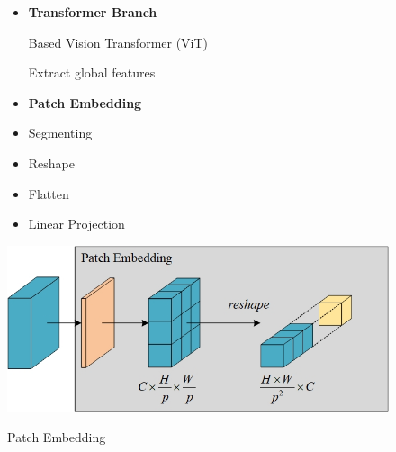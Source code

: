\documentclass[CJK,aspectratio=169]{beamer}  %
\begin{document}
	\begin{frame}
		\begin{figure}
			\centering
			\begin{minipage}{.45\textwidth}
			\begin{itemize} 
				\item \textbf{Transformer Branch}
				
				Based Vision Transformer (ViT)
				
				Extract global features
				
			\end{itemize}
			
	
			\begin{itemize} 
				\item \textbf{Patch Embedding}
				
				\item[\checkmark] Segmenting
				
				\item[\checkmark] Reshape
				
				\item[\checkmark] Flatten
				
				\item[\checkmark] Linear Projection
				
			\end{itemize}
			\end{minipage}
			\begin{minipage}{.45\textwidth}
				\includegraphics[width=0.85\linewidth]{picture/LLIE/My Architecture/Patch Embedding}
				\captionsetup{font=scriptsize}
				\caption*{Patch Embedding}
			\end{minipage}
			\captionsetup{font=scriptsize}
			\caption*{
				\label{fig: Patch Embedding}
			}
		\end{figure}
	\end{frame}
\end{document}
